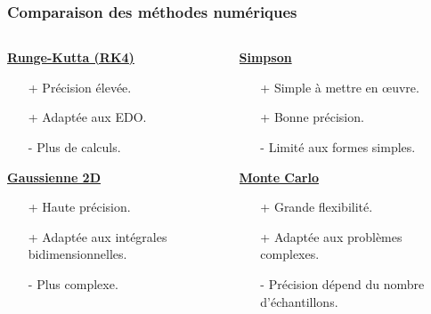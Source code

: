\documentclass[10pt]{beamer}
\begin{document}
\begin{frame}
    \frametitle{Comparaison des méthodes numériques}

    \begin{columns}[T] %
        \begin{column}{.45\textwidth}
            \underline{\textbf{Runge-Kutta (RK4)}}
            \begin{itemize}
                \item[+] Précision élevée.
                \item[+] Adaptée aux EDO.
                \item[-] Plus de calculs.
            \end{itemize}
            \vspace{10pt}
            \underline{\textbf{Gaussienne 2D}}
            \begin{itemize}
                \item[+] Haute précision.
                \item[+] Adaptée aux intégrales bidimensionnelles.
                \item[-] Plus complexe.
            \end{itemize}
        \end{column}
        
        \begin{column}{.45\textwidth}
            \underline{\textbf{Simpson}}
            \begin{itemize}
                \item[+] Simple à mettre en œuvre.
                \item[+] Bonne précision.
                \item[-] Limité aux formes simples.
            \end{itemize}
            \vspace{10pt}
            \underline{\textbf{Monte Carlo}}
            \begin{itemize}
                \item[+] Grande flexibilité.
                \item[+] Adaptée aux problèmes complexes.
                \item[-] Précision dépend du nombre d'échantillons.
            \end{itemize}
        \end{column}
    \end{columns}

\end{frame}
    
\end{document}
